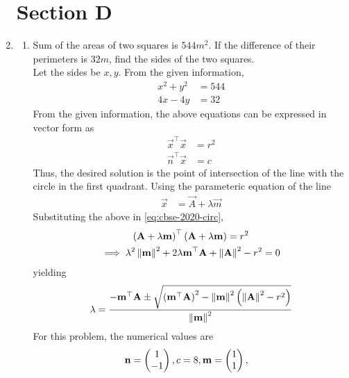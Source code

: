 \documentclass[journal,12pt,twocolumn]{IEEEtran}
\begin{document}
\begin{enumerate}[label=4.\arabic*]
\section{Section D}
    \item \begin{enumerate}
        \item Sum of the areas of two squares is $544 m^2$. If the difference of their perimeters is $32m$, find the sides of the two squares.\\
		\solution Let the sides be $x, y$.  From the given information, 
		    \begin{align}
			    x^2 +y^2 &= 544
			    \\
			    4x - 4y &= 32
		    \end{align}
		    From the given information, the above equations can be expressed in vector form as 
		    \begin{align}
			    \label{eq:cbse-2020-circ}
			    \vec{x}^{\top}\vec{x} &= r^2
			    \\
			    \vec{n}^{\top}\vec{x} &= c
		    \end{align}
		    Thus, the desired solution is the point of intersection of the line with the circle in the first quadrant.  Using the parameteric equation of the line 
		    \begin{align}
			    \label{eq:cbse-2020-circ-line-param}
			    \vec{x} &= \vec{A} + \lambda \vec{m}
		    \end{align}
			    Substituting the above in \eqref{eq:cbse-2020-circ}, 
		    \begin{multline}
			    \left( \mathbf{A} + \lambda \mathbf{m}\right)^{\top}
			    \left( \mathbf{A} + \lambda \mathbf{m}\right)
			    = r^2
			    \\
			    \implies \lambda^2\left\lVert\mathbf{m}\right\rVert^2+ 2 \lambda \mathbf{m}^{\top}\mathbf{A}
			    +\left\lVert\mathbf{A}\right\rVert^2 - r^2 = 0
		    \end{multline}
		    yielding 
		    {\small
		    \begin{align}
			    \label{eq:cbse-2020-circ_lam}
		\lambda = \frac{-\mathbf{m}^{\top}\mathbf{A}\pm \sqrt{\left(\mathbf{m}^{\top}\mathbf{A}\right)^2 -\left\lVert\mathbf{m}\right\rVert^2\left(\left\lVert\mathbf{A}\right\rVert^2 - r^2 \right)}}{\left\lVert\mathbf{m}\right\rVert^2}
		    \end{align}
		    }
		    For this problem, the numerical values are
		    \begin{align}
			    \label{eq:cbse-2020-circ_param}
			    \vec{n} &= \myvec{1 \\ -1}, c = 8, 
		\vec{m} = \myvec{1 \\ 1}, 

\end{align}
\end{enumerate}
\end{enumerate}
\end{document}
